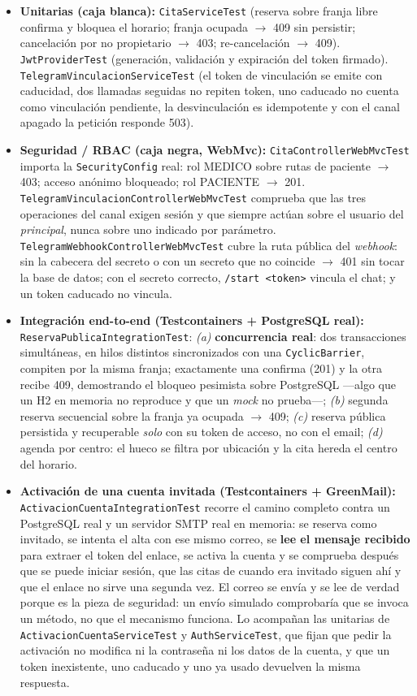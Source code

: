 \documentclass[12pt,a4paper]{report}
\begin{document}
\begin{itemize}
  \item \textbf{Unitarias (caja blanca):} \texttt{CitaServiceTest} (reserva sobre franja libre confirma y bloquea el horario; franja ocupada $\rightarrow$ 409 sin persistir; cancelación por no propietario $\rightarrow$ 403; re-cancelación $\rightarrow$ 409). \texttt{JwtProviderTest} (generación, validación y expiración del token firmado). \texttt{TelegramVinculacionServiceTest} (el token de vinculación se emite con caducidad, dos llamadas seguidas no repiten token, uno caducado no cuenta como vinculación pendiente, la desvinculación es idempotente y con el canal apagado la petición responde 503).
  \item \textbf{Seguridad / RBAC (caja negra, WebMvc):} \texttt{CitaControllerWebMvcTest} importa la \texttt{SecurityConfig} real: rol MEDICO sobre rutas de paciente $\rightarrow$ 403; acceso anónimo bloqueado; rol PACIENTE $\rightarrow$ 201. \texttt{TelegramVinculacionControllerWebMvcTest} comprueba que las tres operaciones del canal exigen sesión y que siempre actúan sobre el usuario del \emph{principal}, nunca sobre uno indicado por parámetro. \texttt{TelegramWebhookControllerWebMvcTest} cubre la ruta pública del \emph{webhook}: sin la cabecera del secreto o con un secreto que no coincide $\rightarrow$ 401 sin tocar la base de datos; con el secreto correcto, \texttt{/start <token>} vincula el chat; y un token caducado no vincula.
  \item \textbf{Integración end-to-end (Testcontainers + PostgreSQL real):} \texttt{ReservaPublicaIntegrationTest}: \emph{(a)} \textbf{concurrencia real}: dos transacciones simultáneas, en hilos distintos sincronizados con una \texttt{CyclicBarrier}, compiten por la misma franja; exactamente una confirma (201) y la otra recibe 409, demostrando el bloqueo pesimista sobre PostgreSQL —algo que un H2 en memoria no reproduce y que un \emph{mock} no prueba—; \emph{(b)} segunda reserva secuencial sobre la franja ya ocupada $\rightarrow$ 409; \emph{(c)} reserva pública persistida y recuperable \emph{solo} con su token de acceso, no con el email; \emph{(d)} agenda por centro: el hueco se filtra por ubicación y la cita hereda el centro del horario.
  \item \textbf{Activación de una cuenta invitada (Testcontainers + GreenMail):} \texttt{ActivacionCuentaIntegrationTest} recorre el camino completo contra un PostgreSQL real y un servidor SMTP real en memoria: se reserva como invitado, se intenta el alta con ese mismo correo, se \textbf{lee el mensaje recibido} para extraer el token del enlace, se activa la cuenta y se comprueba después que se puede iniciar sesión, que las citas de cuando era invitado siguen ahí y que el enlace no sirve una segunda vez. El correo se envía y se lee de verdad porque es la pieza de seguridad: un envío simulado comprobaría que se invoca un método, no que el mecanismo funciona. Lo acompañan las unitarias de \texttt{ActivacionCuentaServiceTest} y \texttt{AuthServiceTest}, que fijan que pedir la activación no modifica ni la contraseña ni los datos de la cuenta, y que un token inexistente, uno caducado y uno ya usado devuelven la misma respuesta.

\end{itemize}
\end{document}
